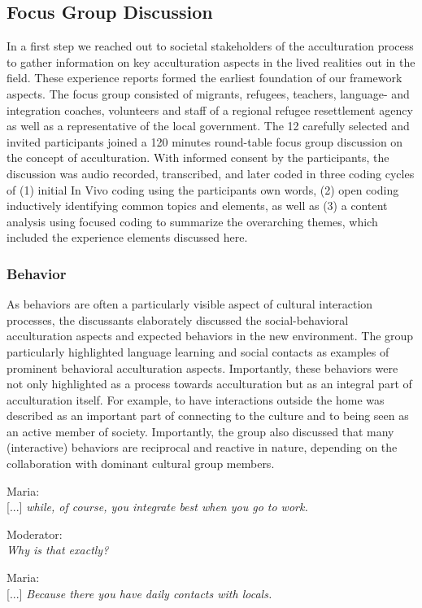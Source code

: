 \documentclass[man, 12pt, a4paper]{apa7}
\begin{document}
\subsection{Focus Group Discussion}
In a first step we reached out to societal stakeholders of the acculturation process to gather information on key acculturation aspects in the lived realities out in the field. These experience reports formed the earliest foundation of our framework aspects. The focus group consisted of migrants, refugees, teachers, language- and integration coaches, volunteers and staff of a regional refugee resettlement agency as well as a representative of the local government. The 12 carefully selected and invited participants joined a 120 minutes round-table focus group discussion on the concept of acculturation. With informed consent by the participants, the discussion was audio recorded, transcribed, and later coded in three coding cycles of (1) initial In Vivo coding using the participants own words, (2) open coding inductively identifying common topics and elements, as well as (3) a content analysis using focused coding to summarize the overarching themes, which included the experience elements discussed here.

\subsubsection{Behavior}
As behaviors are often a particularly visible aspect of cultural interaction processes, the discussants elaborately discussed the social-behavioral acculturation aspects and expected behaviors in the new environment. The group particularly highlighted language learning and social contacts as examples of prominent behavioral acculturation aspects. Importantly, these behaviors were not only highlighted as a process towards acculturation but as an integral part of acculturation itself. For example, to have interactions outside the home was described as an important part of connecting to the culture and to being seen as an active member of society. Importantly, the group also discussed that many (interactive) behaviors are reciprocal and reactive in nature, depending on the collaboration with dominant cultural group members.
\begin{displayquote}
    Maria:\\
    {[...]} \textit{while, of course, you integrate best when you go to work.}
    
    Moderator:\\
    \textit{Why is that exactly?}
    
    Maria:\\
    {[...]} \textit{Because there you have daily contacts with locals.}
\end{displayquote}
\end{document}
